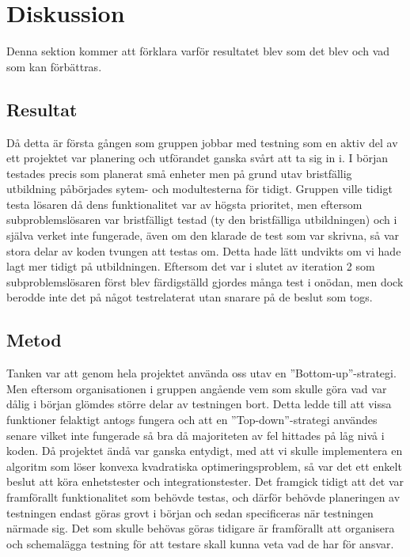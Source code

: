 \section{Diskussion}
	Denna sektion kommer att förklara varför resultatet blev som det blev och vad som kan förbättras.	
	
	\subsection{Resultat}
	Då detta är första gången som gruppen jobbar med testning som en aktiv del av ett projektet var planering och utförandet ganska svårt att ta sig in i. I början testades precis som planerat små enheter men på grund utav bristfällig utbildning påbörjades sytem- och modultesterna för tidigt. Gruppen ville tidigt testa lösaren då dens funktionalitet var av högsta prioritet, men eftersom subproblemslösaren var bristfälligt testad (ty den bristfälliga utbildningen) och i själva verket inte fungerade, även om den klarade de test som var skrivna, så var stora delar av koden tvungen att testas om. Detta hade lätt undvikts om vi hade lagt mer tidigt på utbildningen. Eftersom det var i slutet av iteration 2 som subproblemslösaren först blev färdigställd gjordes många test i onödan, men dock berodde inte det på något testrelaterat utan snarare på de beslut som togs. 
	
	\subsection{Metod}
	Tanken var att genom hela projektet använda oss utav en ''Bottom-up''-strategi. Men eftersom organisationen i gruppen angående vem som skulle göra vad var dålig i början glömdes större delar av testningen bort. Detta ledde till att vissa funktioner felaktigt antogs fungera och att en ''Top-down''-strategi användes senare vilket inte fungerade så bra då majoriteten av fel hittades på låg nivå i koden.
	Då projektet ändå var ganska entydigt, med att vi skulle implementera en algoritm som löser konvexa kvadratiska optimeringsproblem, så var det ett enkelt beslut att köra enhetstester och integrationstester. Det framgick tidigt att det var framförallt funktionalitet som behövde testas, och därför behövde planeringen av testningen endast göras grovt i början och sedan specificeras när testningen närmade sig. Det som skulle behövas göras tidigare är framförallt att organisera och schemalägga testning för att testare skall kunna veta vad de har för ansvar.
	
